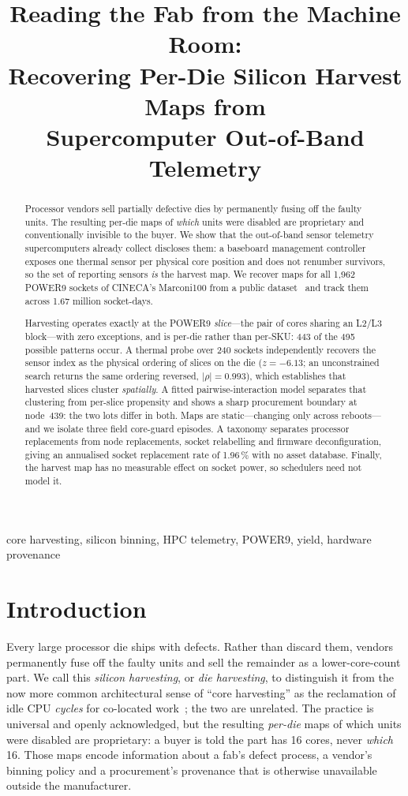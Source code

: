 \documentclass[10pt,conference]{IEEEtran}
\title{Reading the Fab from the Machine Room:\\
Recovering Per-Die Silicon Harvest Maps from\\
Supercomputer Out-of-Band Telemetry}
\author{\IEEEauthorblockN{Mohsen Seyedkazemi Ardebili}
\IEEEauthorblockA{\textit{Department of Electrical, Electronic and Information Engineering} \\
\textit{University of Bologna}, Italy \\ \texttt{mohsen.seyedkazemi@unibo.it}}
\and
\IEEEauthorblockN{Andrea Bartolini}
\IEEEauthorblockA{\textit{Department of Electrical, Electronic and Information Engineering} \\
\textit{University of Bologna}, Italy \\ \texttt{a.bartolini@unibo.it}}}
\begin{document}
\maketitle

\begin{abstract}
Processor vendors sell partially defective dies by permanently fusing off the faulty units. The
resulting per-die maps of \emph{which} units were disabled are proprietary and conventionally
invisible to the buyer. We show that the out-of-band sensor telemetry supercomputers already
collect discloses them: a baseboard management controller exposes one thermal sensor per physical
core position and does not renumber survivors, so the set of reporting sensors \emph{is} the
harvest map. We recover maps for all 1{,}962 POWER9 sockets of CINECA's Marconi100 from a public
dataset~\cite{borghesi2023m100} and track them across 1.67 million socket-days.

Harvesting operates exactly at the POWER9 \emph{slice}---the pair of cores sharing an L2/L3
block---with zero exceptions, and is per-die rather than per-SKU: 443 of the 495 possible patterns
occur. A thermal probe over 240 sockets independently recovers the sensor index as the physical
ordering of slices on the die ($z=-6.13$; an unconstrained search returns the same ordering
reversed, $|\rho|=0.993$), which establishes that harvested slices cluster \emph{spatially}. A
fitted pairwise-interaction model separates that clustering from per-slice propensity and shows a
sharp procurement boundary at node~439: the two lots differ in both. Maps are static---changing
only across reboots---and we isolate three field core-guard episodes. A taxonomy separates processor replacements from node
replacements, socket relabelling and firmware deconfiguration, giving an annualised socket
replacement rate of 1.96\,\% with no asset database. Finally, the harvest map has no measurable
effect on socket power, so schedulers need not model it.
\end{abstract}

\begin{IEEEkeywords}
core harvesting, silicon binning, HPC telemetry, POWER9, yield, hardware provenance
\end{IEEEkeywords}

\section{Introduction}
Every large processor die ships with defects. Rather than discard them, vendors permanently fuse
off the faulty units and sell the remainder as a lower-core-count part. We call this \emph{silicon
harvesting}, or \emph{die harvesting}, to distinguish it from the now more common architectural
sense of ``core harvesting'' as the reclamation of idle CPU \emph{cycles} for co-located
work~\cite{hardharvest2025}; the two are unrelated.
The practice is universal and openly acknowledged, but the resulting \emph{per-die} maps of which
units were disabled are proprietary: a buyer is told the part has 16 cores, never \emph{which} 16.
Those maps encode information about a fab's defect process, a vendor's binning policy and a
procurement's provenance that is otherwise unavailable outside the manufacturer.
\end{document}
